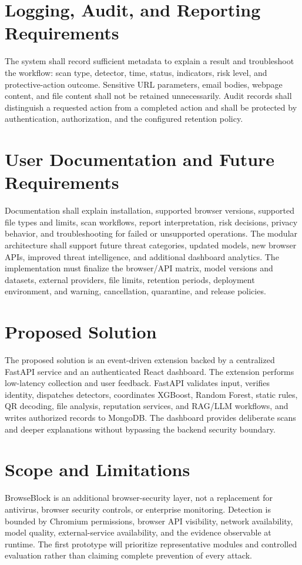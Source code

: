 \section{Logging, Audit, and Reporting Requirements}
The system shall record sufficient metadata to explain a result and troubleshoot
the workflow: scan type, detector, time, status, indicators, risk level, and
protective-action outcome. Sensitive URL parameters, email bodies, webpage content,
and file content shall not be retained unnecessarily. Audit records shall distinguish
a requested action from a completed action and shall be protected by authentication,
authorization, and the configured retention policy.

\section{User Documentation and Future Requirements}
Documentation shall explain installation, supported browser versions, supported
file types and limits, scan workflows, report interpretation, risk decisions,
privacy behavior, and troubleshooting for failed or unsupported operations. The
modular architecture shall support future threat categories, updated models, new
browser APIs, improved threat intelligence, and additional dashboard analytics.
The implementation must finalize the browser/API matrix, model versions and
datasets, external providers, file limits, retention periods, deployment
environment, and warning, cancellation, quarantine, and release policies.

\section{Proposed Solution}
The proposed solution is an event-driven extension backed by a centralized
FastAPI service and an authenticated React dashboard. The extension performs
low-latency collection and user feedback. FastAPI validates input, verifies
identity, dispatches detectors, coordinates XGBoost, Random Forest, static rules,
QR decoding, file analysis, reputation services, and RAG/LLM workflows, and writes
authorized records to MongoDB. The dashboard provides deliberate scans and deeper
explanations without bypassing the backend security boundary.

\section{Scope and Limitations}
BrowseBlock is an additional browser-security layer, not a replacement for
antivirus, browser security controls, or enterprise monitoring. Detection is
bounded by Chromium permissions, browser API visibility, network availability,
model quality, external-service availability, and the evidence observable at
runtime. The first prototype will prioritize representative modules and controlled
evaluation rather than claiming complete prevention of every attack.
